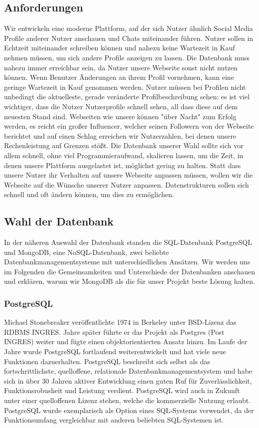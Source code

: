 \subsection{Anforderungen}
Wir entwickeln eine moderne Plattform, auf der sich Nutzer ähnlich Social Media Profile anderer Nutzer anschauen und Chats miteinander führen. Nutzer sollen in Echtzeit miteinander schreiben können und nahezu keine Wartezeit in Kauf nehmen müssen, um sich andere Profile anzeigen zu lassen. Die Datenbank muss nahezu immer erreichbar sein, da Nutzer unsere Webseite sonst nicht nutzen können. 
Wenn Benutzer Änderungen an ihrem Profil vornehmen, kann eine geringe Wartezeit in Kauf genommen werden. Nutzer müssen bei Profilen nicht unbedingt die aktuelleste, gerade veränderte Profilbeschreibung sehen; es ist viel wichtiger, dass die Nutzer Nutzerprofile schnell sehen, all dass diese auf dem neuesten Stand sind. 
Webseiten wie unsere können "über Nacht" zum Erfolg werden, es reicht ein großer Influencer, welcher seinen Followern von der Webseite berichtet und auf einen Schlag erreichen wir Nutzerzahlen, bei denen unsere Rechenleistung auf Grenzen stößt. Die Datenbank unserer Wahl sollte sich vor allem schnell, ohne viel Programmieraufwand, skalieren lassen, um die Zeit, in denen unsere Plattform ausgelastet ist, möglichst gering zu halten. 
Statt dass unsere Nutzer ihr Verhalten auf unsere Webseite anpassen müssen, wollen wir die Webseite auf die Wünsche unserer Nutzer anpassen. Datenstrukturen sollen sich schnell und oft ändern können, um dies zu ermöglichen.

\subsection{Wahl der Datenbank}
In der näheren Auswahl der Datenbank standen die SQL-Datenbank PostgreSQL und MongoDB, eine NoSQL-Datenbank, zwei beliebte Datenbankmanagementsysteme mit unterschiedlichen Ansätzen. Wir werden uns im Folgenden die Gemeinsamkeiten und Unterschiede der Datenbanken anschauen und erklären, warum wir MongoDB als die für unser Projekt beste Lösung halten.

\subsubsection{PostgreSQL}
Michael Stonebreaker veröffentlichte 1974 in Berkeley unter BSD-Lizenz das RDBMS INGRES. Jahre später führte er das Projekt als Postgres (Post INGRES) weiter und fügte einen objektorientierten Ansatz hinzu. \cite{PG1} Im Laufe der Jahre wurde PostgreSQL fortlaufend weiterentwickelt und hat viele neue Funktionen dazuerhalten.
PostgreSQL beschreibt sich selbst als das fortschrittlichste, quelloffene, relationale Datenbankmanagementsystem und habe sich in über 30 Jahren aktiver Entwicklung einen guten Ruf für Zuverlässlichkeit, Funktionsrobusheit und Leistung verdient. \cite{PG2} PostgreSQL wird auch in Zukunft unter einer quelloffenen Lizenz stehen, welche die kommerzielle Nutzung erlaubt. \cite{PG3}
PostgreSQL wurde exemplarisch als Option eines SQL-Systems verwendet, da der Funktionsumfang vergleichbar mit anderen beliebten SQL-Systemen ist. \cite{PG4}

